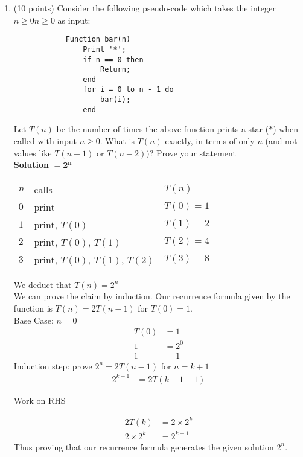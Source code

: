 \documentclass{article}
\begin{document}
    \begin{enumerate}[label=\textbf{Q2}]
        \item (10 points) Consider the following pseudo-code which takes the integer $n \geq 0n \geq 0$ as input:
        \begin{verbatim}
            Function bar(n)
                Print '*';
                if n == 0 then
                    Return;
                end
                for i = 0 to n - 1 do
                    bar(i);
                end
        \end{verbatim}
        Let $T(n)$ be the number of times the above function prints a star ($*$) when called with input $n \geq 0$.
        What is $T(n)$ exactly, in terms of only $n$ (and not values like $T(n - 1)$ or $T(n - 2))$? Prove your
        statement\\[0.25in]
        \textbf{Solution} $= \mathbf{2^n}$\\
        \begin{tabular}{l l l}
            $n$ & calls & $T(n)$\\
            $0$ & print & $T(0) = 1$\\
            $1$ & print, $T(0)$ & $T(1) = 2$\\
            $2$ & print, $T(0)$, $T(1)$ & $T(2) = 4$\\
            $3$ & print, $T(0)$, $T(1)$, $T(2)$ & $T(3) = 8$\\
        \end{tabular}

        We deduct that $T(n) = 2^n$\\
        We can prove the claim by induction. Our recurrence formula given by the function is $T(n) = 2T(n-1)$ for 
        $T(0) = 1$.\\
        Base Case: $n = 0$
        \begin{align*}
            T(0) &= 1\\
            1 &= 2^0\\
            1 &= 1
        \end{align*}
        Induction step: prove $2^n = 2T(n-1)$ for $n = k+1$
        \begin{align*}
            \boxed{2^{k+1}} &= 2T(k+1-1)
        \end{align*}
        \centerline{Work on RHS}
        \begin{align*}
            2T(k) &= 2 \times 2^k\\
            2 \times 2^k &= \boxed{2^{k+1}}
        \end{align*}
        Thus proving that our recurrence formula generates the given solution $2^n$.

    \end{enumerate}
\end{document}
